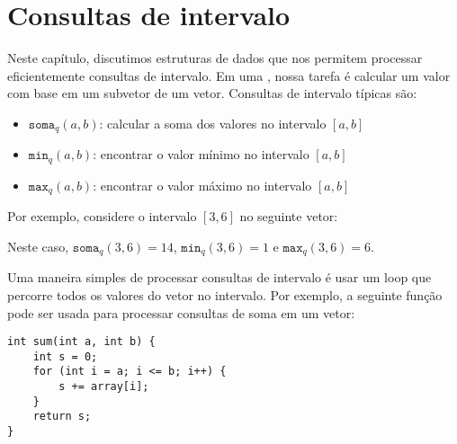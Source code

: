 \chapter{Consultas de intervalo}


Neste capítulo, discutimos estruturas de dados
que nos permitem processar eficientemente consultas de intervalo.
Em uma ,
nossa tarefa é calcular um valor
com base em um subvetor de um vetor.
Consultas de intervalo típicas são:
\begin{itemize}
\item $\texttt{soma}_q(a,b)$: calcular a soma dos valores no intervalo $[a,b]$
\item $\texttt{min}_q(a,b)$: encontrar o valor mínimo no intervalo $[a,b]$
\item $\texttt{max}_q(a,b)$: encontrar o valor máximo no intervalo $[a,b]$
\end{itemize}

Por exemplo, considere o intervalo $[3,6]$ no seguinte vetor:
\begin{center}
\end{center}
Neste caso, $\texttt{soma}_q(3,6)=14$,
$\texttt{min}_q(3,6)=1$ e $\texttt{max}_q(3,6)=6$.

Uma maneira simples de processar consultas de intervalo é usar
um loop que percorre todos os valores do vetor no intervalo.
Por exemplo, a seguinte função pode ser
usada para processar consultas de soma em um vetor:

\begin{lstlisting}
int sum(int a, int b) {
    int s = 0;
    for (int i = a; i <= b; i++) {
        s += array[i];
    }
    return s;
}
\end{lstlisting}

